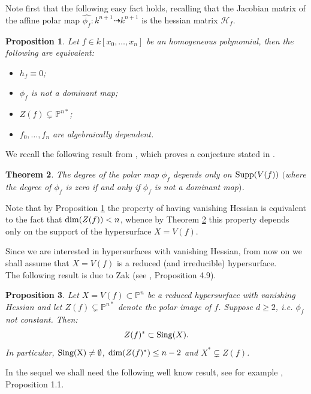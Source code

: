 \documentclass[11pt,a4paper]{amsart}
\newtheorem{theorem}{Theorem}[section]
\newtheorem{prop}[theorem]{Proposition}
\newcommand{\PP}{ \mathbb{P}}
\begin{document}
Note first that the following  easy fact holds, recalling that the
Jacobian matrix of the affine polar map
$\widehat{\phi_f}:k^{n+1}\dasharrow k^{n+1}$ is the hessian matrix
$\mathcal H_f$.

\begin{prop}\label{prop: h=0 iff non dominant} Let $f\in k[x_0, \ldots, x_n]$ be an homogeneous polynomial, then the following are equivalent:
\begin{itemize}
\item $h_f\equiv 0$; \item $\phi_f$ is not a dominant map; \item
$Z(f)\subsetneq\PP^{n*}$; \item $f_0,\ldots, f_n$ are
algebraically dependent.
\end{itemize}
\end{prop}

We recall the following result from \cite{DimcaPapadima}, which
proves a conjecture stated in \cite{Dolg}.

\begin{theorem}\cite[Corollary 2]{DimcaPapadima}\label{polar degree}
The degree of the polar map $\phi_f$ depends only on ${\rm
Supp}(V(f))$ $($where the degree of  $\phi_f$ is zero if and only
if $\phi_f$ is not a dominant map$)$.
\end{theorem}

Note that by Proposition \ref{prop: h=0 iff non dominant} the
property of having vanishing Hessian is equivalent to the fact
that ${\rm dim}(Z(f))<n$, whence by Theorem \ref{polar degree} this
property depends only on the support of the hypersurface $X=V(f)$.


Since we are interested in hypersurfaces with vanishing Hessian,
from now on we shall assume that $X=V(f)$ is a reduced (and
irreducible) hypersurface.\\

The following result is due to Zak (see \cite{Zak}, Proposition
4.9).
\begin{prop}\label{prop: dimension of Z dual}
Let $X=V(f)\subset \mathbb{P}^n$ be a reduced hypersurface with
vanishing Hessian and let $Z(f)\subsetneq \mathbb{P}^{n*}$ denote
the polar image of $f$. Suppose $d\geq 2$, i.e. $\phi_f$ not
constant. Then:
$$Z(f)^*\subset {\rm Sing} (X).$$
In particular, ${\rm Sing(X)}\neq\emptyset$, ${\rm dim}
(Z(f)^*)\leq n-2$  and $X^*\subsetneq Z(f)$.
\end{prop}


In the sequel  we shall need the following well know result, see for
example \cite{Ein}, Proposition 1.1.
\end{document}
